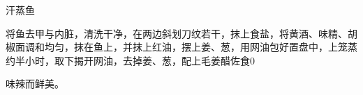 \begin{recipe}{汗蒸鱼}

\ingredients



\cooking

将鱼去甲与内脏，清洗干净，在两边斜划刀纹若干，抹上食盐，将黄酒、味精、胡椒面调和均匀，抹在鱼上，并抹上红油，摆上姜、葱，用网油包好置盘中，上笼蒸约半小时，取下揭开网油，去掉姜、葱，配上毛姜醋佐食0

\notes

味辣而鲜美。

\end{recipe}

